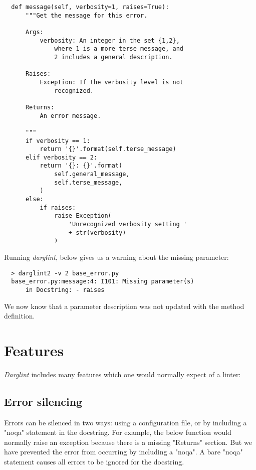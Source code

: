 \documentclass[landscape]{sciposter}
\begin{document}
\begin{multicols}{4}
\begin{verbatim}
  def message(self, verbosity=1, raises=True):
      """Get the message for this error.

      Args:
          verbosity: An integer in the set {1,2},
              where 1 is a more terse message, and
              2 includes a general description.

      Raises:
          Exception: If the verbosity level is not
              recognized.

      Returns:
          An error message.

      """
      if verbosity == 1:
          return '{}'.format(self.terse_message)
      elif verbosity == 2:
          return '{}: {}'.format(
              self.general_message,
              self.terse_message,
          )
      else:
          if raises:
              raise Exception(
                  'Unrecognized verbosity setting '
                  + str(verbosity)
              )
\end{verbatim}

            Running \textit{darglint}, below gives us a warning about the missing
            parameter:

\begin{verbatim}
  > darglint2 -v 2 base_error.py
  base_error.py:message:4: I101: Missing parameter(s)
      in Docstring: - raises
\end{verbatim}

            We now know that a parameter description was not updated with
            the method definition. \\

    \section{Features}

        \textit{Darglint} includes many features which one would normally expect
        of a linter:

        \subsection{Error silencing}
            Errors can be silenced in two ways: using a configuration file,
            or by including a "noqa" statement in the docstring.  For example,
            the below function would normally raise an exception because
            there is a missing "Returns" section.  But we have prevented the
            error from occurring by including a "noqa".  A bare "noqa"
            statement causes all errors to be ignored for the docstring.


\end{multicols}
\end{document}
